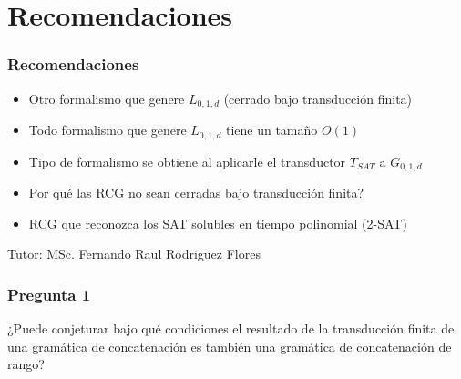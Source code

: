 \documentclass{beamer}
\newcommand{\tutor}{MSc. Fernando Raul Rodriguez Flores} %
\begin{document}
\section{Recomendaciones}
\begin{frame}
    \frametitle{Recomendaciones}
    
    \begin{itemize}
        \item Otro formalismo que genere $L_{0,1,d}$ (cerrado bajo transducción finita)
              \pause
        \item Todo formalismo que genere $L_{0,1,d}$ tiene un tamaño $O(1)$
              \pause
        \item Tipo de formalismo se obtiene al aplicarle el transductor $T_{SAT}$ a $G_{0,1,d}$
              \pause
        \item Por qué las RCG no sean cerradas bajo transducción finita?
              \pause
        \item RCG que reconozca los SAT solubles en tiempo polinomial (2-SAT)
    \end{itemize}
    
    
\end{frame}

\begin{frame}
    \titlepage
    \vspace{1cm} %
    \begin{center}
        Tutor: \tutor
    \end{center}
\end{frame}

\begin{frame}
    \frametitle{Pregunta 1}
    
    ¿Puede conjeturar bajo qué condiciones el resultado de la transducción finita de una gramática de concatenación es también una gramática de concatenación de rango?
\end{frame}
\end{document}
